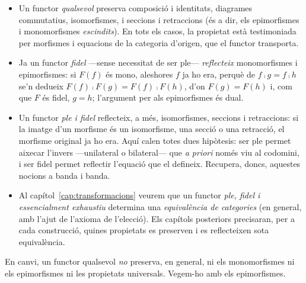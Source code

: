 \begin{itemize}
\item Un functor \emph{qualsevol} preserva composició i identitats, diagrames commutatius, isomorfismes, i seccions i retraccions (és a dir, els epimorfismes i monomorfismes \emph{escindits}). En tots els casos, la propietat està testimoniada per morfismes i equacions de la categoria d'origen, que el functor transporta.
\item Ja un functor \emph{fidel} ---sense necessitat de ser ple--- \emph{reflecteix} monomorfismes i epimorfismes: si $F(f)$ és mono, aleshores $f$ ja ho era, perquè de $f\comp g=f\comp h$ se'n dedueix $F(f)\comp F(g)=F(f)\comp F(h)$, d'on $F(g)=F(h)$ i, com que $F$ és fidel, $g=h$; l'argument per als epimorfismes és dual.
\item Un functor \emph{ple i fidel} reflecteix, a més, isomorfismes, seccions i retraccions: si la imatge d'un morfisme és un isomorfisme, una secció o una retracció, el morfisme original ja ho era. Aquí calen totes dues hipòtesis: ser ple permet aixecar l'invers ---unilateral o bilateral--- que \emph{a priori} només viu al codomini, i ser fidel permet reflectir l'equació que el defineix. Recupera, doncs, aquestes nocions a banda i banda.
\item Al capítol~\ref{cap:transformacions} veurem que un functor \emph{ple, fidel i essencialment exhaustiu} determina una \emph{equivalència de categories} (en general, amb l'ajut de l'axioma de l'elecció). Els capítols posteriors precisaran, per a cada construcció, quines propietats es preserven i es reflecteixen sota equivalència.

\end{itemize}

En canvi, un functor qualsevol \emph{no} preserva, en general, ni els monomorfismes ni els epimorfismes ni les propietats universals. Vegem-ho amb els epimorfismes.

